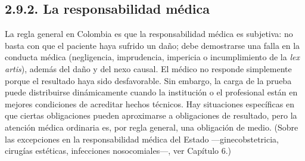 \subsection{2.9.2. La responsabilidad médica}
La regla general en Colombia es que la responsabilidad médica es subjetiva: no basta con que el paciente haya sufrido un daño; debe demostrarse una falla en la conducta médica (negligencia, imprudencia, impericia o incumplimiento de la \textit{lex artis}), además del daño y del nexo causal. El médico no responde simplemente porque el resultado haya sido desfavorable. Sin embargo, la carga de la prueba puede distribuirse dinámicamente cuando la institución o el profesional están en mejores condiciones de acreditar hechos técnicos. Hay situaciones específicas en que ciertas obligaciones pueden aproximarse a obligaciones de resultado, pero la atención médica ordinaria es, por regla general, una obligación de medio. (Sobre las excepciones en la responsabilidad médica del Estado —ginecobstetricia, cirugías estéticas, infecciones nosocomiales—, ver Capítulo 6.)

